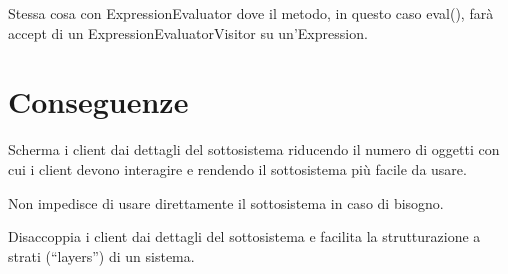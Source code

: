 Stessa cosa con ExpressionEvaluator dove il metodo, in questo caso eval(), farà accept di un ExpressionEvaluatorVisitor su un'Expression.

\section{Conseguenze}

Scherma i client dai dettagli del sottosistema riducendo il numero di oggetti con cui i client devono interagire e rendendo il sottosistema più facile da usare.

Non impedisce di usare direttamente il sottosistema in caso di bisogno.

Disaccoppia i client dai dettagli del sottosistema e facilita la strutturazione a strati (“layers”) di un sistema.